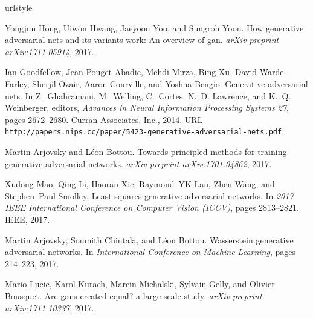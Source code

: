 \documentclass{article}
\begin{document}
%

\begin{thebibliography}{25}
	\providecommand{\natexlab}[1]{#1}
	\providecommand{\url}[1]{\texttt{#1}}
	\expandafter\ifx\csname urlstyle\endcsname\relax
	\providecommand{\doi}[1]{doi: #1}\else
	\providecommand{\doi}{doi: \begingroup \urlstyle{rm}\Url}\fi
	
	Yongjun Hong, Uiwon Hwang, Jaeyoon Yoo, and Sungroh Yoon.
	\newblock How generative adversarial nets and its variants work: An overview of
	gan.
	\newblock \emph{arXiv preprint arXiv:1711.05914}, 2017.
	
	Ian Goodfellow, Jean Pouget-Abadie, Mehdi Mirza, Bing Xu, David Warde-Farley,
	Sherjil Ozair, Aaron Courville, and Yoshua Bengio.
	\newblock Generative adversarial nets.
	\newblock In Z.~Ghahramani, M.~Welling, C.~Cortes, N.~D. Lawrence, and K.~Q.
	Weinberger, editors, \emph{Advances in Neural Information Processing Systems
		27}, pages 2672--2680. Curran Associates, Inc., 2014.
	\newblock URL
	\url{http://papers.nips.cc/paper/5423-generative-adversarial-nets.pdf}.
	
	Martin Arjovsky and L{\'e}on Bottou.
	\newblock Towards principled methods for training generative adversarial
	networks.
	\newblock \emph{arXiv preprint arXiv:1701.04862}, 2017.
	
	Xudong Mao, Qing Li, Haoran Xie, Raymond~YK Lau, Zhen Wang, and Stephen~Paul
	Smolley.
	\newblock Least squares generative adversarial networks.
	\newblock In \emph{2017 IEEE International Conference on Computer Vision
		(ICCV)}, pages 2813--2821. IEEE, 2017.
	
	Martin Arjovsky, Soumith Chintala, and L{\'e}on Bottou.
	\newblock Wasserstein generative adversarial networks.
	\newblock In \emph{International Conference on Machine Learning}, pages
	214--223, 2017.
	
	Mario Lucic, Karol Kurach, Marcin Michalski, Sylvain Gelly, and Olivier
	Bousquet.
	\newblock Are gans created equal? a large-scale study.
	\newblock \emph{arXiv preprint arXiv:1711.10337}, 2017.
	

\end{thebibliography}
\end{document}
